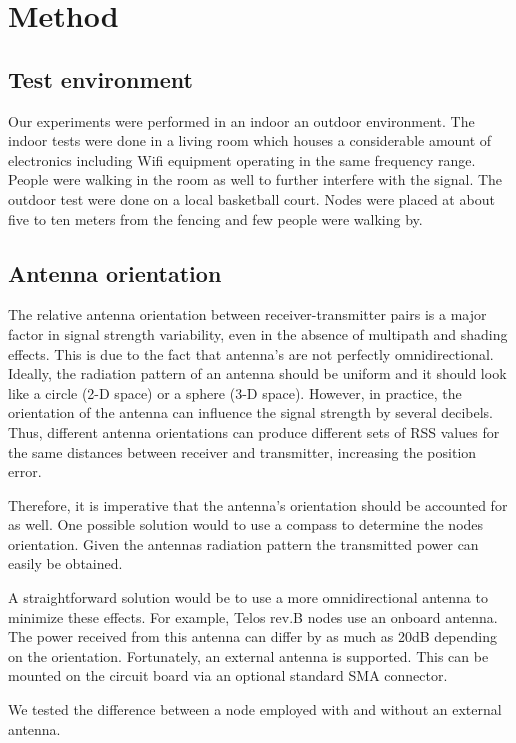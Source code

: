 \section{Method}
\subsection{Test environment}
Our experiments were performed in an indoor an outdoor environment. The indoor tests were done in a living room which houses a considerable amount of electronics including Wifi equipment operating in the same frequency range. People were walking in the room as well to further interfere with the signal. The outdoor test were done on a local basketball court. Nodes were placed at about five to ten meters from the fencing and few people were walking by.

\subsection{Antenna orientation}
The relative antenna orientation between receiver-transmitter pairs is a major factor in signal strength variability, even in the absence of multipath and shading effects\cite{lymberopoulos2006ecr}. This is due to the fact that antenna's are not perfectly omnidirectional. Ideally, the radiation pattern of an antenna should be uniform and it should look like a circle (2-D space) or a sphere (3-D space). However, in practice, the orientation of the antenna can influence the signal strength by several decibels. Thus, different antenna orientations can produce different sets of RSS values for the same distances between receiver and transmitter, increasing the position error.

Therefore, it is imperative that the antenna's orientation should be accounted for as well. One possible solution would to use a compass to determine the nodes orientation. Given the antennas radiation pattern the transmitted power can easily be obtained. 

A straightforward solution would be to use a more omnidirectional antenna to minimize these effects. For example, Telos rev.B nodes use an onboard antenna. The power received from this antenna can differ by as much as 20dB depending on the orientation.  Fortunately, an external antenna is supported. This can be mounted on the circuit board via an optional standard SMA connector. 

We tested the difference between a node employed with and without an external antenna.

